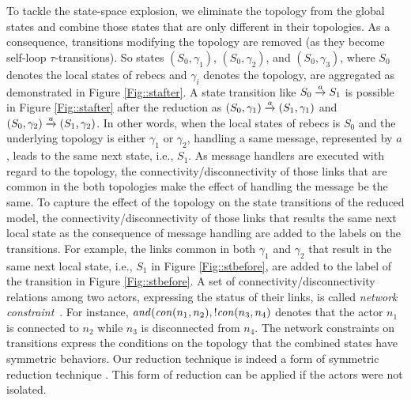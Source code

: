 To tackle the state-space explosion, we eliminate the topology from the global states and combine those states that are only different in their topologies. As a consequence, transitions modifying the topology are removed (as they become self-loop $\tau$-transitions). So states $(S_0,\gamma_1)$, $(S_0,\gamma_2)$, and $(S_0,\gamma_3)$, 
where $S_0$ denotes the local states of rebecs and $\gamma_i$ denotes the  topology, are aggregated as demonstrated in Figure \ref{Fig::stafter}. %
A state transition like $S_0\overto{a} S_1$ is possible in Figure \ref{Fig::stafter} after the reduction as $(S_0,\gamma_1)\overto{a}(S_1,\gamma_1)$ and $(S_0,\gamma_2)\overto{a}(S_1,\gamma_2)$. In other words, when the local states of rebecs is $S_0$ and the underlying topology is either $\gamma_1$ or $\gamma_2$, handling a same message, represented by $a$, leads to the same next state, i.e., $S_1$.  As message handlers are executed with regard to the topology, the connectivity/disconnectivity of those links that are common in the both topologies make the effect of handling the message be the same. To capture the effect of the topology on the state transitions of the reduced model, the connectivity/disconnectivity of those links
that results the same next local state as the consequence of message handling %
are added to the labels on the transitions. For example, %
the links common in both $\gamma_{1}$ and $\gamma_{2}$ that result in the same next local state, i.e., $S_1$ in Figure \ref{Fig::stbefore}, are added to the label of the transition in Figure \ref{Fig::stbefore}. 
%
A set of connectivity/disconnectivity relations among two actors, expressing the status of their links, is called \emph{network constraint}~\cite{FatemehFI10,FatemehFI19}. For instance, ${\it and}({\it con}(n_1,n_2),!{\it con}(n_3,n_4)$ denotes that the actor  $n_1$ is connected to $n_2$ while $n_3$ is disconnected from $n_4$. The network constraints on transitions express the conditions on the topology that the combined states have symmetric behaviors.  Our reduction technique is indeed a form of symmetric reduction technique \cite{clarke1998symmetry}. This form of reduction can be applied if the actors were not isolated. %

